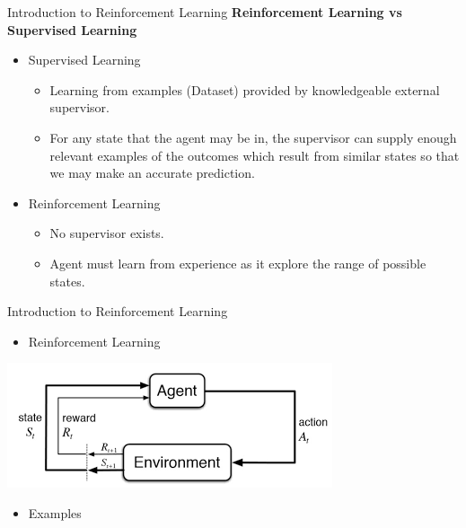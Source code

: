 \documentclass{beamer}
\begin{document}
\begin{frame}[t]{Introduction to Reinforcement Learning} %
\textbf{Reinforcement Learning vs Supervised Learning}
\begin{itemize}
\item Supervised Learning
	\begin{itemize}
	\item Learning from examples (Dataset) provided by knowledgeable external supervisor.
	\item For any state that the agent may be in, the supervisor can supply enough relevant examples of the outcomes which result from similar states so that we may make an accurate prediction.
	\end{itemize}
\item Reinforcement Learning
	\begin{itemize}
	\item No supervisor exists.
	\item Agent must learn from experience as it explore the range of possible states.
	\end{itemize}
\end{itemize}
\end{frame}


\begin{frame}[t]{Introduction to Reinforcement Learning} %
\begin{itemize}
\item Reinforcement Learning
\end{itemize}
\begin{center}
\includegraphics[scale=0.40]{rein}
\end{center}
\begin{itemize}
\item Examples
\end{itemize}
\begin{center}
\end{center}
\end{frame}
\end{document}
